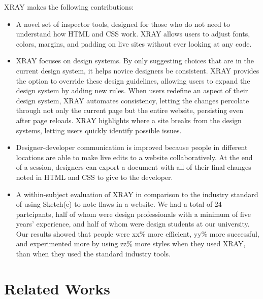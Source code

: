 \documentclass{sigchi}
\newcommand{\xray}{XRAY\xspace}
\begin{document}

\xray makes the following contributions: 

\begin{itemize}
    \item A novel set of inspector tools, designed for those who do not need to understand how HTML and CSS work. \xray allows users to adjust fonts, colors, margins, and padding on live sites without ever looking at any code. 
    
    \item \xray focuses on design systems. By only suggesting choices that are in the current design system, it helps novice designers be consistent. \xray provides the option to override these design guidelines, allowing users to expand the design system by adding new rules. When users redefine an aspect of their design system, \xray automates consistency, letting the changes percolate through not only the current page but the entire website, persisting even after page reloads. \xray highlights where a site breaks from the design systems, letting users quickly identify possible issues. 
    
    \item Designer-developer communication is improved because people in different locations are able to make live edits to a website collaboratively. At the end of a session, designers can export a document with all of their final changes noted in HTML and CSS to give to the developer.  
    
    \item A within-subject evaluation of \xray in comparison to the industry standard of using Sketch(c) to note flaws in a website. We had a total of 24 partcipants, half of whom were design professionals with a minimum of five years' experience, and half of whom were design students at our university. Our results showed that people were xx\% more efficient, yy\% more successful, and experimented more by using zz\% more styles when they used \xray, than when they used the standard industry tools.
\end{itemize}


\section{Related Works}
\end{document}
